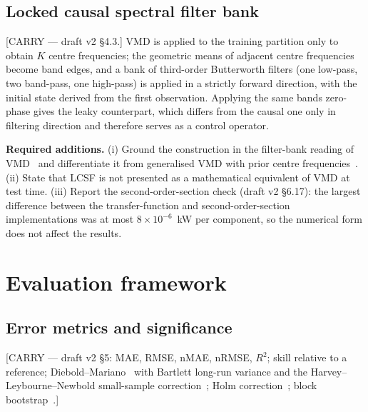 \documentclass[review,3p,times]{elsarticle}
\newcommand{\carry}[1]{\textsf{\small [CARRY --- #1]}}
\begin{document}
\subsection{Locked causal spectral filter bank}\label{sec:lcsf}
\carry{draft v2 §4.3.} VMD is applied to the training partition only to obtain
$K$ centre frequencies; the geometric means of adjacent centre frequencies
become band edges, and a bank of third-order Butterworth filters (one
low-pass, two band-pass, one high-pass) is applied in a strictly
forward direction, with the initial state derived from the first observation.
Applying the same bands zero-phase gives the leaky counterpart, which differs
from the causal one only in filtering direction and therefore serves as a
control operator.

\textbf{Required additions.} (i) Ground the construction in the filter-bank
reading of VMD~\cite{dragomiretskiy2014} and differentiate it from generalised
VMD with prior centre frequencies~\cite{guo2021}. (ii) State that LCSF is not
presented as a mathematical equivalent of VMD at test time. (iii) Report the
second-order-section check (draft v2 §6.17): the largest difference between the
transfer-function and second-order-section implementations was at most
$8\times10^{-6}$~kW per component, so the numerical form does not affect the
results.

\section{Evaluation framework}\label{sec:eval}

\subsection{Error metrics and significance}
\carry{draft v2 §5: MAE, RMSE, nMAE, nRMSE, $R^2$; skill relative to a
reference; Diebold--Mariano~\cite{dm1995} with Bartlett long-run variance and
the Harvey--Leybourne--Newbold small-sample correction~\cite{hln1997}; Holm
correction~\cite{holm1979}; block bootstrap~\cite{kunsch1989}.}
\end{document}
